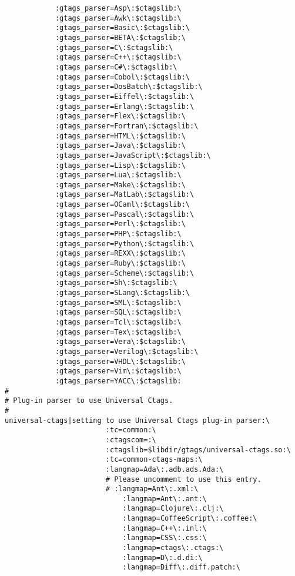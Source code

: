 \documentclass[11pt]{article}
\begin{document}
\begin{lstlisting}
            :gtags_parser=Asp\:$ctagslib:\
            :gtags_parser=Awk\:$ctagslib:\
            :gtags_parser=Basic\:$ctagslib:\
            :gtags_parser=BETA\:$ctagslib:\
            :gtags_parser=C\:$ctagslib:\
            :gtags_parser=C++\:$ctagslib:\
            :gtags_parser=C#\:$ctagslib:\
            :gtags_parser=Cobol\:$ctagslib:\
            :gtags_parser=DosBatch\:$ctagslib:\
            :gtags_parser=Eiffel\:$ctagslib:\
            :gtags_parser=Erlang\:$ctagslib:\
            :gtags_parser=Flex\:$ctagslib:\
            :gtags_parser=Fortran\:$ctagslib:\
            :gtags_parser=HTML\:$ctagslib:\
            :gtags_parser=Java\:$ctagslib:\
            :gtags_parser=JavaScript\:$ctagslib:\
            :gtags_parser=Lisp\:$ctagslib:\
            :gtags_parser=Lua\:$ctagslib:\
            :gtags_parser=Make\:$ctagslib:\
            :gtags_parser=MatLab\:$ctagslib:\
            :gtags_parser=OCaml\:$ctagslib:\
            :gtags_parser=Pascal\:$ctagslib:\
            :gtags_parser=Perl\:$ctagslib:\
            :gtags_parser=PHP\:$ctagslib:\
            :gtags_parser=Python\:$ctagslib:\
            :gtags_parser=REXX\:$ctagslib:\
            :gtags_parser=Ruby\:$ctagslib:\
            :gtags_parser=Scheme\:$ctagslib:\
            :gtags_parser=Sh\:$ctagslib:\
            :gtags_parser=SLang\:$ctagslib:\
            :gtags_parser=SML\:$ctagslib:\
            :gtags_parser=SQL\:$ctagslib:\
            :gtags_parser=Tcl\:$ctagslib:\
            :gtags_parser=Tex\:$ctagslib:\
            :gtags_parser=Vera\:$ctagslib:\
            :gtags_parser=Verilog\:$ctagslib:\
            :gtags_parser=VHDL\:$ctagslib:\
            :gtags_parser=Vim\:$ctagslib:\
            :gtags_parser=YACC\:$ctagslib:
#
# Plug-in parser to use Universal Ctags.
#
universal-ctags|setting to use Universal Ctags plug-in parser:\
                        :tc=common:\
                        :ctagscom=:\
                        :ctagslib=$libdir/gtags/universal-ctags.so:\
                        :tc=common-ctags-maps:\
                        :langmap=Ada\:.adb.ads.Ada:\
                        # Please uncomment to use this entry.
                        # :langmap=Ant\:.xml:\
                            :langmap=Ant\:.ant:\
                            :langmap=Clojure\:.clj:\
                            :langmap=CoffeeScript\:.coffee:\
                            :langmap=C++\:.inl:\
                            :langmap=CSS\:.css:\
                            :langmap=ctags\:.ctags:\
                            :langmap=D\:.d.di:\
                            :langmap=Diff\:.diff.patch:\

\end{lstlisting}
\end{document}

